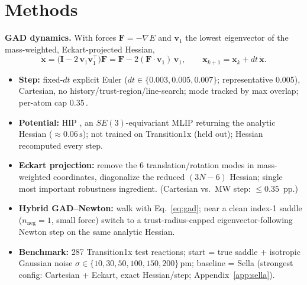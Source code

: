 \documentclass[11pt]{article}
\newcommand{\SI}[2]{#1\,\text{#2}}
\newcommand{\nneg}{\ensuremath{n_{\mathrm{neg}}}}
\renewcommand{\pm}{\ensuremath{\,\text{pm}}}
\begin{document}
\section{Methods}\label{sec:methods}
\textbf{GAD dynamics.} With forces $\mathbf{F}=-\nabla E$ and $\mathbf{v}_1$ the
lowest eigenvector of the mass-weighted, Eckart-projected Hessian,
\begin{equation}
\dot{\mathbf{x}} = \bigl(\mathbf{I} - 2\,\mathbf{v}_1\mathbf{v}_1^{\!\top}\bigr)\mathbf{F}
= \mathbf{F} - 2(\mathbf{F}\!\cdot\!\mathbf{v}_1)\,\mathbf{v}_1 ,
\qquad
\mathbf{x}_{k+1} = \mathbf{x}_k + dt\,\dot{\mathbf{x}} .
\label{eq:gad}
\end{equation}
\begin{itemize}
\item \textbf{Step:} fixed-$dt$ explicit Euler ($dt\!\in\!\{0.003,0.005,0.007\}$;
  representative 0.005), Cartesian, no history/trust-region/line-search; mode
  tracked by max overlap; per-atom cap \SI{0.35}{\AA}.
\item \textbf{Potential:} HIP \cite{hip}, an $SE(3)$-equivariant MLIP returning
  the analytic Hessian ($\approx\!\SI{0.06}{s}$); not trained on Transition1x
  (held out); Hessian recomputed every step.
\item \textbf{Eckart projection:} remove the 6 translation/rotation modes in
  mass-weighted coordinates, diagonalize the reduced $(3N\!-\!6)$ Hessian; single
  most important robustness ingredient. (Cartesian vs.\ MW step: $\le 0.35$~pp.)
\item \textbf{Hybrid GAD--Newton:} walk with Eq.~\eqref{eq:gad}; near a clean
  index-1 saddle ($\nneg{=}1$, small force) switch to a trust-radius-capped
  eigenvector-following Newton step on the same analytic Hessian.
\item \textbf{Benchmark:} 287 Transition1x \cite{transition1x} test reactions;
  start = true saddle + isotropic Gaussian noise
  $\sigma\!\in\!\{10,30,50,100,150,200\}\pm$; baseline = Sella \cite{sella2022}
  (strongest config: Cartesian + Eckart, exact Hessian/step;
  Appendix~\ref{app:sella}).
\end{itemize}
\end{document}
